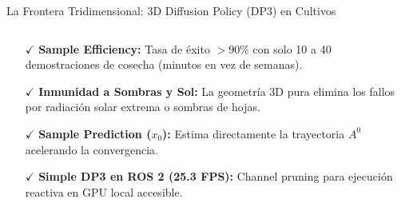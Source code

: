 \begin{frame}{La Frontera Tridimensional: 3D Diffusion Policy (DP3) en Cultivos}
\begin{columns}[T, onlytextwidth]
    \begin{column}{0.47\textwidth}
      \begin{tcolorbox}[
        enhanced,
        colback=AgriGreenLight,
        colframe=AgriGreen,
        arc=\CardArc,
        boxrule=\CardRule,
        height=\CardHeightDouble,
        title={\CardTitleFont Impacto en Agro-Robótica de Campo},
        colbacktitle=AgriGreen,
        coltitle=WhiteBg,
        top=1.0mm, bottom=1.0mm, left=1.6mm, right=1.6mm
      ]
        {\BodyFont
        \begin{itemize}\setlength{\itemsep}{1.2pt}
          \item[\textcolor{AgriGreen}{\textbf{$\checkmark$}}] \textbf{Sample Efficiency:} Tasa de éxito $>90\%$ con solo 10 a 40 demostraciones de cosecha (minutos en vez de semanas).
          \item[\textcolor{AgriGreen}{\textbf{$\checkmark$}}] \textbf{Inmunidad a Sombras y Sol:} La geometría 3D pura elimina los fallos por radiación solar extrema o sombras de hojas.
          \item[\textcolor{AgriGreen}{\textbf{$\checkmark$}}] \textbf{Sample Prediction ($x_0$):} Estima directamente la trayectoria $A^0$ acelerando la convergencia.
          \item[\textcolor{AgriGreen}{\textbf{$\checkmark$}}] \textbf{Simple DP3 en ROS 2 (25.3 FPS):} Channel pruning para ejecución reactiva en GPU local accesible.
        \end{itemize}}
      \end{tcolorbox}
    \end{column}
  \end{columns}
\end{frame}


